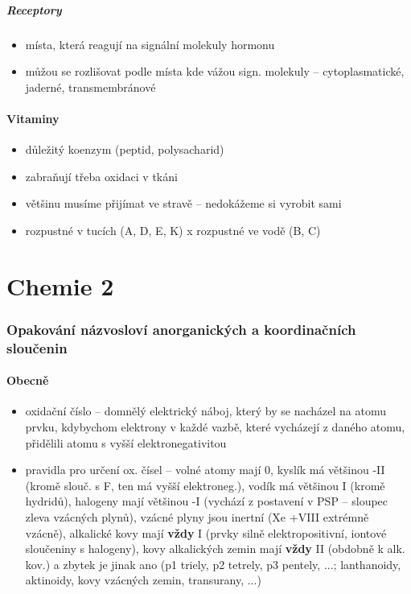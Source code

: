 \documentclass{article}
\begin{document}
\subsubsection{Receptory}
\begin{itemize}
  \item místa, která reagují na signální molekuly hormonu
  \item můžou se rozlišovat podle místa kde vážou sign. molekuly -- cytoplasmatické, jaderné, transmembránové
\end{itemize}

\subsection{Vitaminy}
\begin{itemize}
  \item důležitý koenzym (peptid, polysacharid)
  \item zabraňují třeba oxidaci v tkáni
  \item většinu musíme přijímat ve stravě -- nedokážeme si vyrobit sami
  \item rozpustné v tucích (A, D, E, K) x rozpustné ve vodě (B, C)
\end{itemize}

\part{Chemie 2}

\section{Opakování názvosloví anorganických a koordinačních sloučenin}

\subsection{Obecně}

\begin{itemize}
  \item oxidační číslo -- domnělý elektrický náboj, který by se nacházel na atomu prvku, kdybychom elektrony v každé vazbě, které vycházejí z daného atomu, přidělili atomu s vyšší elektronegativitou
  \item pravidla pro určení ox. čísel -- volné atomy mají 0, kyslík má většinou -II (kromě slouč. s F, ten má vyšší elektroneg.), vodík má většinou I (kromě hydridů), halogeny mají většinou -I (vychází z postavení v PSP -- sloupec zleva vzácných plynů), vzácné plyny jsou inertní (Xe +VIII extrémně vzácně), alkalické kovy mají \textbf{vždy} I (prvky silně elektropositivní, iontové sloučeniny s halogeny), kovy alkalických zemin mají \textbf{vždy} II (obdobně k alk. kov.) a zbytek je jinak ano (p1 triely, p2 tetrely, p3 pentely, ...; lanthanoidy, aktinoidy, kovy vzácných zemin, transurany, ...)
\end{itemize}
\end{document}
